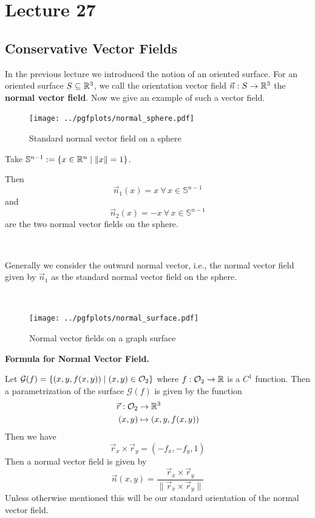 \documentclass[../Analysis-3.tex]{subfiles}
\begin{document}
\chapter*{Lecture 27} %
\setcounter{chapter}{27} %
\setcounter{section}{0}
\setcounter{equation}{0}
\setcounter{figure}{0}


\section{Conservative Vector Fields}

In the previous lecture we introduced the notion of an oriented surface. For an oriented surface $S \subseteq \mathbb{R}^3$, we call the orientation vector field $\vec{n} : S \to \mathbb{R}^3$ the \textbf{normal vector field}. Now we give an example of such a vector field.

\begin{Eg}{}{}
  \begin{figure}
    \centering
    \texttt{[image: ../pgfplots/normal\_sphere.pdf]}
    \caption{Standard normal vector field on a sphere}\label{fig1:27}
  \end{figure}
  Take $\mathbb{S}^{n-1} := \{ x \in \mathbb{R}^n \mid \norm{x} = 1 \}$.

  Then
  \[ \vec{n}_1(x) = x \ \forall \, x \in \mathbb{S}^{n-1} \] and
  \[ \vec{n}_2(x) = -x \ \forall \, x \in \mathbb{S}^{n-1} \]
  are the two normal vector fields on the sphere.

  \

  Generally we consider the outward normal vector, i.e., the normal vector field given by $\vec{n}_1$ as the standard normal vector field on the sphere.
\end{Eg}

\

\begin{tcolorbox}

  \begin{figure}
    \centering
    \texttt{[image: ../pgfplots/normal\_surface.pdf]}
    \caption{Normal vector fields on a graph surface}
    \label{fig2:27}
  \end{figure}

  \textbf{Formula for Normal Vector Field.}

  Let $\mathcal{G}(f) = \qty{ (x,y,f(x,y)) \mid (x,y) \in \mathcal{O}_{2}}$ where $f: \mathcal{O}_{2} \to \mathbb{R}$ is a $C^1$ function. Then a parametrization of the surface $\mathcal{G}(f)$ is given by the function
  \begin{align*}
    \vec{r} : \mathcal{O}_{2} & \to \mathbb{R}^3             \\
    (x,y)            & \mapsto (x,y,f(x,y))
  \end{align*}
  Then we have
  \[
    \vec{r}_x \times \vec{r}_y = (-f_x, -f_y, 1)
  \]
  Then a normal vector field is given by
  \[
    \vec{n}(x,y) = \frac{\vec{r}_x \times \vec{r}_y}{\|\vec{r}_x \times \vec{r}_y \|}
  \]
  Unless otherwise mentioned this will be our standard orientation of the normal vector field.

\end{tcolorbox}
\end{document}
